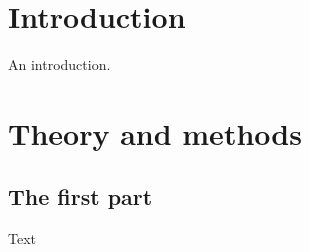 \documentclass[%
 reprint,
 nobalancelastpage,
 amsmath,amssymb,
 aps,
]{revtex4-1}
\begin{document}


\maketitle

\section{\label{sec:Int}Introduction}
An introduction.


\section{\label{sec:The}Theory and methods}

\subsection{\label{sec:Fir}The first part}
Text %

\end{document}
